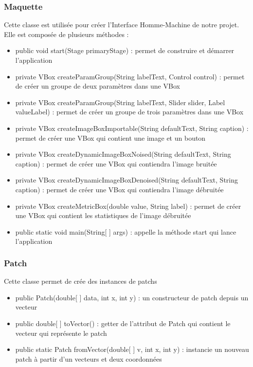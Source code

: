 \subsubsection{Maquette}
Cette classe est utilisée pour créer l'Interface Homme-Machine de notre projet.
Elle est composée de plusieurs méthodes :
\begin{itemize}
    \item public void start(Stage primaryStage) : permet de construire et démarrer l'application
    \item private VBox createParamGroup(String labelText, Control control) : permet de créer un groupe de deux paramètres dans une VBox
    \item private VBox createParamGroup(String labelText, Slider slider, Label valueLabel) : permet de créer un groupe de trois paramètres dans une VBox
    \item private VBox createImageBoxImportable(String defaultText, String caption) : permet de créer une VBox qui contient une image et un bouton
    \item private VBox createDynamicImageBoxNoised(String defaultText, String caption) : permet de créer une VBox qui contiendra l'image bruitée
    \item private VBox createDynamicImageBoxDenoised(String defaultText, String caption) : permet de créer une VBox qui contiendra l'image débruitée
    \item private VBox createMetricBox(double value, String label) : permet de créer une VBox qui contient les statistiques de l'image débruitée
    \item public static void main(String[ ] args) : appelle la méthode start qui lance l'application
\end{itemize}

\subsubsection{Patch}
Cette classe permet de crée des instances de patchs
\begin{itemize}
    \item public Patch(double[ ] data, int x, int y) : un constructeur de patch depuis un vecteur
    \item public double[ ] toVector() : getter de l'attribut de Patch qui contient le vecteur qui représente le patch 
    \item public static Patch fromVector(double[ ] v, int x, int y) : instancie un nouveau patch à partir d'un vecteurs et deux coordonnées
\end{itemize}

